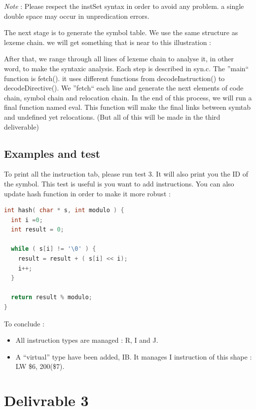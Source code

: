 \documentclass[twoside,twocolumn]{article}
\begin{document}
\textit{Note} : Please respect the instSet syntax in order to avoid any problem. a single double space may occur in unpredication errors.

The next stage is to generate the symbol table. We use the same structure as lexeme chain. we will get something that is near to this illustration :


After that, we range through all lines of lexeme chain to analyse it, in other word, to make the syntaxic analysis. Each step is described in syn.c. The ''main`` function is fetch(). it uses different functions from decodeInstruction() to decodeDirective(). We ''fetch`` each line and generate the next elements of code chain, symbol chain and relocation chain. In the end of this process, we will run a final function named eval. This function will make the final links between symtab and undefined yet relocations. (But all of this will be made in the third deliverable)


\subsection{Examples and test}
To print all the instruction tab, please run test 3. It will also print you the ID of the symbol. This test is useful is you want to add instructions.  You can also update hash function in order to make it more robust :

\begin{lstlisting}[language=C]
int hash( char * s, int modulo ) {
  int i =0;
  int result = 0;

  while ( s[i] != '\0' ) {
    result = result + ( s[i] << i);
    i++;
  }
  
  return result % modulo;
}
\end{lstlisting}

To conclude :
\begin{itemize}
 \item All instruction types are managed : R, I and J.
 \item A ``virtual'' type have been added, IB. It manages I instruction of this shape : LW \$6, 200(\$7).
\end{itemize}



\section{Delivrable 3}
\end{document}
